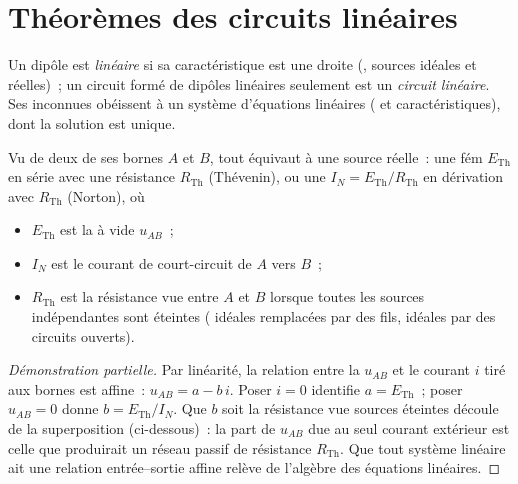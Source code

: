 \section{Théorèmes des circuits linéaires}

\begin{definition}\label{def:b1:dc-circuits:linear}
Un dipôle est \emph{linéaire} si sa caractéristique est une droite
(, sources idéales et réelles)~; un circuit formé de
dipôles linéaires seulement est un \emph{circuit linéaire}. Ses inconnues
obéissent à un système d'équations linéaires ( et
caractéristiques), dont la solution est unique.
\end{definition}

\begin{theorem}\label{thm:b1:dc-circuits:thevenin}
Vu de deux de ses bornes $A$ et $B$, tout  équivaut à
une source réelle~: une fém $E_{\mathrm{Th}}$ en série avec une
résistance $R_{\mathrm{Th}}$ (Thévenin), ou une  $I_N =
E_{\mathrm{Th}}/R_{\mathrm{Th}}$ en dérivation avec $R_{\mathrm{Th}}$
(Norton), où
\begin{itemize}
  \item $E_{\mathrm{Th}}$ est la  à vide $u_{AB}$~;
  \item $I_N$ est le courant de court-circuit de $A$ vers $B$~;
  \item $R_{\mathrm{Th}}$ est la résistance vue entre $A$ et $B$
        lorsque toutes les sources indépendantes sont éteintes ( idéales remplacées par des fils, 
        idéales par des circuits ouverts).
\end{itemize}
\end{theorem}

\begin{proof}[Démonstration partielle]
Par linéarité, la relation entre la  $u_{AB}$ et le courant $i$
tiré aux bornes est affine~: $u_{AB} = a - b\,i$. Poser $i = 0$
identifie $a = E_{\mathrm{Th}}$~; poser $u_{AB} = 0$ donne
$b = E_{\mathrm{Th}}/I_N$. Que $b$ soit la résistance vue sources
éteintes découle de la superposition (ci-dessous)~: la part de $u_{AB}$
due au seul courant extérieur est celle que produirait un réseau passif
de résistance $R_{\mathrm{Th}}$. Que tout système linéaire ait une
relation entrée--sortie affine relève de l'algèbre des équations
linéaires.
\end{proof}

